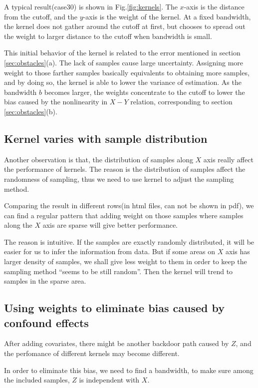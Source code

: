 \documentclass[a4 paper,12pt]{article}
\begin{document}
A typical result(case30) is shown in Fig.\ref{fig:kernels}. The $x$-axis is the distance from the cutoff, and the $y$-axis is the weight of the kernel. At a fixed bandwidth, the kernel does not gather around the cutoff at first, but chooses to spread out the weight to larger distance to the cutoff when bandwidth is small.

This initial behavior of the kernel is related to the error mentioned in section \ref{sec:obstacles}(a). The lack of samples cause large uncertainty. Assigning more weight to those farther samples basically equivalents to obtaining more samples, and by doing so, the kernel is able to lower the variance of estimation. As the bandwidth $b$ becomes larger, the weights concentrate to the cutoff to lower the bias caused by the nonlinearity in $X-Y$ relation, corresponding to section \ref{sec:obstacles}(b).

\subsection*{Kernel varies with sample distribution}

Another observation is that, the distribution of samples along $X$ axis really affect the performance of kernels. The reason is the distribution of samples affect the randomness of sampling, thus we need to use kernel to adjust the sampling method.

Comparing the result in different rows(in html files, can not be shown in pdf), we can find a regular pattern that adding weight on those samples where samples along the $X$ axis are sparse will give better performance. 

The reason is intuitive. If the samples are exactly randomly distributed, it will be easier for us to infer the information from data. But if some areas on $X$ axis has larger density of samples, we shall give less weight to them in order to keep the sampling method ``seems to be still random''. Then the kernel will trend to samples in the sparse area.

\subsection{Using weights to eliminate bias caused by confound effects}
After adding covariates, there might be another backdoor path caused by $Z$, and the perfomance of different kernels may become different.

In order to eliminate this bias, we need to find a bandwidth, to make sure among the included samples, $Z$ is independent with $X$.
\end{document}
